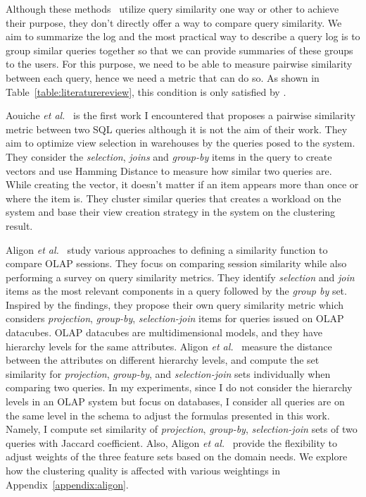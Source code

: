 Although these methods~\cite{agrawal2006context, chatzopoulou2011querie, yang2009, giacometti2009, stefanidis2009you, magda2010snipsuggest} utilize query similarity one way or other to achieve their purpose, they don't directly offer a way to compare query similarity. 
We aim to summarize the log and the most practical way to describe a query log is to group similar queries together so that we can provide summaries of these groups to the users.
For this purpose, we need to be able to measure pairwise similarity between each query, hence we need a metric that can do so. As shown in Table~\ref{table:literaturereview}, this condition is only satisfied by \cite{aouiche2006, aligon2014similarity, makiyama2015text}.

Aouiche \textit{et al.}~\cite{aouiche2006} is the first work I encountered that proposes a pairwise similarity metric between two SQL queries although it is not the aim of their work.
They aim to optimize view selection in warehouses by the queries posed to the system.
They consider the \textit{selection}, \textit{joins} and \textit{group-by} items in the query to create vectors and use Hamming Distance to measure how similar two queries are.
While creating the vector, it doesn't matter if an item appears more than once or where the item is.
They cluster similar queries that creates a workload on the system and base their view creation strategy in the system on the clustering result. 

Aligon \textit{et al.}~\cite{aligon2014similarity} study various approaches to defining a similarity function to compare OLAP sessions.
They focus on comparing session similarity while also performing a survey on query similarity metrics.
They identify \textit{selection} and \textit{join} items as the most relevant components in a query followed by the \textit{group by} set.
Inspired by the findings, they propose their own query similarity metric which considers \textit{projection}, \textit{group-by}, \textit{selection-join} items for queries issued on OLAP datacubes. 
OLAP datacubes are multidimensional models, and they have hierarchy levels for the same attributes. Aligon \textit{et al.}~\cite{aligon2014similarity} measure the distance between the attributes on different hierarchy levels, and compute the set similarity for \textit{projection}, \textit{group-by}, and \textit{selection-join} sets individually when comparing two queries.
In my experiments, since I do not consider the hierarchy levels in an OLAP system but focus on databases, I consider all queries are on the same level in the schema to adjust the formulas presented in this work. 
Namely, I compute set similarity of \textit{projection}, \textit{group-by}, \textit{selection-join} sets of two queries with Jaccard coefficient. 
Also, Aligon \textit{et al.}~\cite{aligon2014similarity} provide the flexibility to adjust weights of the three feature sets based on the domain needs. We explore how the clustering quality is affected with various weightings in Appendix~\ref{appendix:aligon}.

